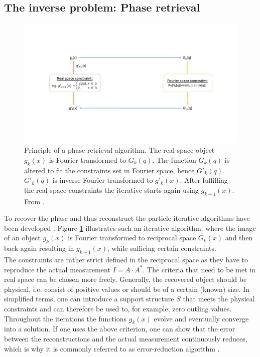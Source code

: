 \subsection{The inverse problem: Phase retrieval}
\begin{figure}
	\centering
		\includegraphics[width=1.00\textwidth]{images/phase-retrieval-algorithm.jpg}
	\caption[Example of a phase retrieval algorithm.]{Principle of a phase retrieval algorithm. The real space object $g_{k}\left(x\right)$ is Fourier transformed to $G_{k}\left(q\right)$. The function $G_{k}\left(q\right)$ is altered to fit the constraints set in Fourier space, hence $G'_{k}\left(q\right)$. $G'_{k}\left(q\right)$ is inverse Fourier transformed to $g'_{k}\left(x\right)$. After fulfilling the real space constraints the iterative starts again using $g_{k+1}\left(x\right)$. From \citep{Fienup-1982-AO}.}
	\label{fig:phase-retrieval-algorithm}
\end{figure}
To recover the phase and thus reconstruct the particle iterative algorithms have been developed \cite{Fienup-1982-AO}. Figure \ref{fig:phase-retrieval-algorithm} illustrates such an iterative algorithm, where the image of an object $g_{k}\left(x\right)$ is Fourier transformed to reciprocal space $G_{k}\left(x\right)$ and then back again resulting in $g_{k+1}(x)$, while sufficing certain constraints.\\
The constraints are rather strict defined in the reciprocal space as they have to reproduce the actual measurement $I=A\cdot A^{*}$. The criteria that need to be met in real space can be chosen more freely. Generally, the recovered object should be physical, i.e. consist of positive values or should be of a certain (known) size. In simplified terms, one can introduce a support structure $S$ that meets the physical constraints and can therefore be used to, for example, zero outling values. Throughout the iterations the functions $g_{k}(x)$ evolve and eventually converge into a solution. If one uses the above criterion, one can show that the error between the reconstructions and the actual measurement continuously reduces, which is why it is commonly referred to as error-reduction algorithm \cite{Fienup-1978-OL}.\\
